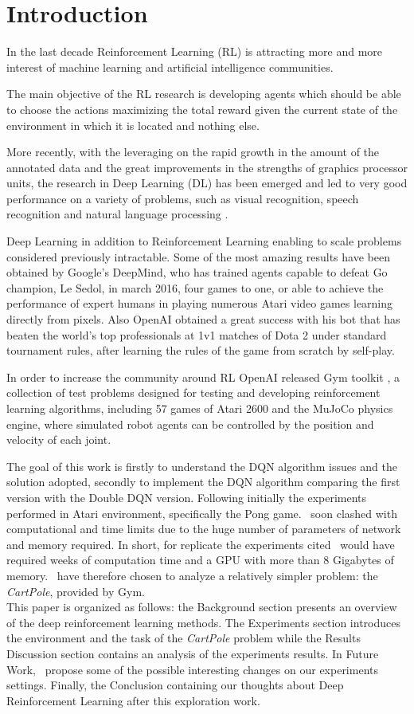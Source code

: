 \section{Introduction}

In the last decade Reinforcement Learning (RL) is attracting more and more interest of machine learning and artificial intelligence communities.

The main objective of the RL research is developing agents which should be able to choose the actions maximizing the total reward given the current state of the environment in which it is located and nothing else.

More recently, with the leveraging on the rapid growth in the amount of the annotated data and the great improvements in the strengths of graphics processor units, the research in Deep Learning (DL) has been emerged and led to very good performance on a variety of problems, such as visual recognition, speech recognition and natural language processing \cite{AdvancesCNN}.

Deep Learning in addition to Reinforcement Learning enabling to scale problems considered previously intractable. Some of the most amazing results have been obtained by Google’s DeepMind, who has trained agents capable to defeat Go champion, Le Sedol, in march 2016, four games to one, or able to achieve the performance of expert humans in playing numerous Atari video games learning directly from pixels. Also OpenAI obtained a great success with his bot that has beaten the world's top professionals at 1v1 matches of Dota 2 under standard tournament rules, after learning the rules of the game from scratch by self-play.

In order to increase the community around RL OpenAI released Gym toolkit \cite{Gym}, a collection of test problems designed for testing and developing reinforcement learning algorithms, including 57 games of Atari 2600 and the MuJoCo physics engine, where simulated robot agents can be controlled by the position and velocity of each joint. 

The goal of this work is firstly to understand the DQN algorithm issues and the solution adopted, secondly to implement the DQN algorithm comparing the first version with the Double DQN version. Following initially the experiments performed in Atari environment, specifically the Pong game. \Auth~soon clashed with computational and time limits due to the huge number of parameters of network and memory required. In short, for replicate the experiments cited \auth~would have required weeks of computation time and a GPU with more than 8 Gigabytes of memory. \Auth~have therefore chosen to analyze a relatively simpler problem: the \textit{CartPole}, provided by Gym.\\

This paper is organized as follows: the Background section presents an overview of the deep reinforcement learning methods. The Experiments section introduces the environment and the task of the \textit{CartPole} problem while the Results Discussion section contains an analysis of the experiments results. In Future Work, \auth~propose some of the possible interesting changes on our experiments settings. Finally, the Conclusion containing our thoughts about Deep Reinforcement Learning after this exploration work.
